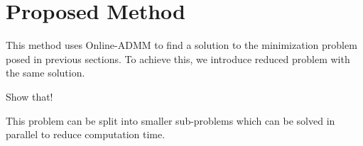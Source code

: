 \documentclass{article}
\newcommand{\h}{\mtxb{h}}
\newcommand{\R}{\mtxb{R}}
\begin{document}


\section{Proposed Method}
\label{sec:proposed_method}
This method uses Online-ADMM to find a solution to the minimization problem posed in previous sections.
To achieve this, we introduce reduced problem with the same solution.
\begin{attention}
    Show that!
\end{attention}
This problem can be split into smaller sub-problems which can be solved in parallel to reduce computation time.
\end{document}
